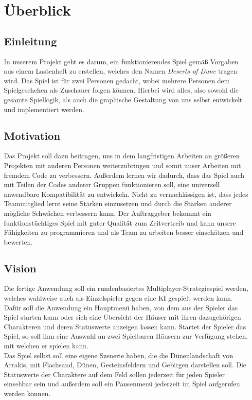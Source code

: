 \documentclass[12pt]{article}
\newcounter{fa}
\begin{document}
\tableofcontents
\thispagestyle{empty}

\newpage

\pagestyle{fancy}

\fancyhead[R]{\thepage}
\fancyhead[L]{\leftmark}
\fancyfoot{}


\section{Überblick}

\subsection{Einleitung}

In unserem Projekt geht es darum, ein funktionierendes Spiel gemäß Vorgaben aus einem Lastenheft zu erstellen, welches den Namen \textit{Deserts of Dune} tragen wird. Das Spiel ist für zwei Personen gedacht, wobei mehrere Personen dem Spielgeschehen als Zuschauer folgen können. Hierbei wird alles, also sowohl die gesamte Spiellogik, als auch die graphische Gestaltung von uns selbst entwickelt und implementiert werden.

\subsection{Motivation}

Das Projekt soll dazu beitragen, uns in dem langfristigen Arbeiten an größeren Projekten mit anderen Personen weiterzubringen und somit unser Arbeiten mit fremdem Code zu verbessern. Außerdem lernen wir dadurch, dass das Spiel auch mit Teilen der Codes anderer Gruppen funktionieren soll, eine universell anwendbare Kompatibilität zu entwickeln. Nicht zu vernachlässigen ist, dass jedes Teammitglied lernt seine Stärken einzusetzen und durch die Stärken anderer mögliche Schwächen verbessern kann.
Der Auftraggeber bekommt ein funktionstüchtiges Spiel mit guter Qualität zum Zeitvertreib und kann unsere Fähigkeiten zu programmieren und als Team zu arbeiten besser einschätzen und bewerten.

\subsection{Vision}
Die fertige Anwendung soll ein rundenbasiertes Multiplayer-Strategiespiel werden, welches wahlweise auch als Einzelspieler gegen eine KI gespielt werden kann. Dafür soll die Anwendung ein Hauptmenü haben, von dem aus der Spieler das Spiel starten kann oder sich eine Übersicht der Häuser mit ihren dazugehörigen Charakteren und deren Statuswerte anzeigen lassen kann. 
Startet der Spieler das Spiel, so soll ihm eine Auswahl an zwei Spielbaren Häusern zur Verfügung stehen, mit welchen er spielen kann. \\
Das Spiel selbst soll eine eigene Szenerie haben, die die Dünenlandschaft von Arrakis, mit Flachsand, Dünen, Gesteinsfeldern und Gebirgen darstellen soll. Die Statuswerte der Charaktere auf dem Feld sollen jederzeit für jeden Spieler einsehbar sein und außerdem soll ein Pausenmenü jederzeit im Spiel aufgerufen werden können.
\end{document}
